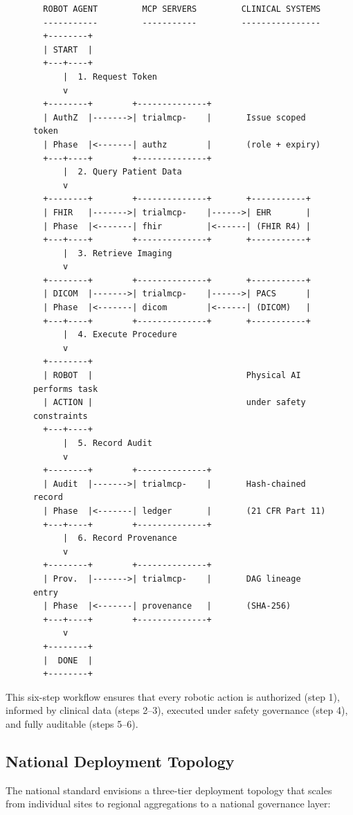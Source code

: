 \begin{figure}[H]
\begin{verbatim}
  ROBOT AGENT         MCP SERVERS         CLINICAL SYSTEMS
  -----------         -----------         ----------------
  +--------+
  | START  |
  +---+----+
      |  1. Request Token
      v
  +--------+        +--------------+
  | AuthZ  |------->| trialmcp-    |       Issue scoped token
  | Phase  |<-------| authz        |       (role + expiry)
  +---+----+        +--------------+
      |  2. Query Patient Data
      v
  +--------+        +--------------+       +-----------+
  | FHIR   |------->| trialmcp-    |------>| EHR       |
  | Phase  |<-------| fhir         |<------| (FHIR R4) |
  +---+----+        +--------------+       +-----------+
      |  3. Retrieve Imaging
      v
  +--------+        +--------------+       +-----------+
  | DICOM  |------->| trialmcp-    |------>| PACS      |
  | Phase  |<-------| dicom        |<------| (DICOM)   |
  +---+----+        +--------------+       +-----------+
      |  4. Execute Procedure
      v
  +--------+
  | ROBOT  |                               Physical AI performs task
  | ACTION |                               under safety constraints
  +---+----+
      |  5. Record Audit
      v
  +--------+        +--------------+
  | Audit  |------->| trialmcp-    |       Hash-chained record
  | Phase  |<-------| ledger       |       (21 CFR Part 11)
  +---+----+        +--------------+
      |  6. Record Provenance
      v
  +--------+        +--------------+
  | Prov.  |------->| trialmcp-    |       DAG lineage entry
  | Phase  |<-------| provenance   |       (SHA-256)
  +---+----+        +--------------+
      v
  +--------+
  |  DONE  |
  +--------+
\end{verbatim}
\end{figure}

This six-step workflow ensures that every robotic action is authorized (step 1), informed by clinical data (steps 2--3), executed under safety governance (step 4), and fully auditable (steps 5--6).

\subsection{National Deployment Topology}

The national standard envisions a three-tier deployment topology that scales from individual sites to regional aggregations to a national governance layer:

